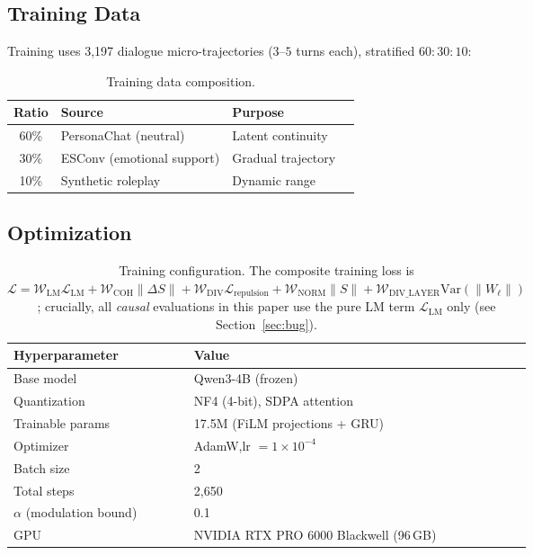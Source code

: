 \documentclass[11pt,a4paper]{article}
\begin{document}
\subsection{Training Data}

Training uses 3{,}197 dialogue micro-trajectories ($3$--$5$ turns each), stratified
$60{:}30{:}10$:

\begin{table}[h]
\centering
\begin{tabular}{clll}
\toprule
\textbf{Ratio} & \textbf{Source} & \textbf{Purpose} \\
\midrule
60\% & PersonaChat (neutral)      & Latent continuity  \\
30\% & ESConv (emotional support) & Gradual trajectory \\
10\% & Synthetic roleplay         & Dynamic range      \\
\bottomrule
\end{tabular}
\caption{Training data composition.}
\end{table}

\subsection{Optimization}

\begin{table}[h]
\centering
\begin{tabular}{ll}
\toprule
\textbf{Hyperparameter} & \textbf{Value} \\
\midrule
Base model         & Qwen3-4B (frozen) \\
Quantization       & NF4 (4-bit), SDPA attention \\
Trainable params   & 17.5M (FiLM projections + GRU) \\
Optimizer          & AdamW,\quad lr $=1\times10^{-4}$ \\
Batch size         & 2 \\
Total steps        & 2{,}650 \\
$\alpha$ (modulation bound) & 0.1 \\
GPU                & NVIDIA RTX PRO 6000 Blackwell (96\,GB) \\
\bottomrule
\end{tabular}
\caption{Training configuration. The composite training loss is
$\mathcal{L} = \mathcal{W}_{\mathrm{LM}}\mathcal{L}_{\mathrm{LM}}
+ \mathcal{W}_{\mathrm{COH}}\|\Delta S\|
+ \mathcal{W}_{\mathrm{DIV}}\mathcal{L}_{\mathrm{repulsion}}
+ \mathcal{W}_{\mathrm{NORM}}\|S\|
+ \mathcal{W}_{\mathrm{DIV\_LAYER}}\mathrm{Var}(\|W_\ell\|)$;
crucially, all \emph{causal} evaluations in this paper use the pure LM term
$\mathcal{L}_{\mathrm{LM}}$ only (see Section~\ref{sec:bug}).}
\end{table}
\end{document}
